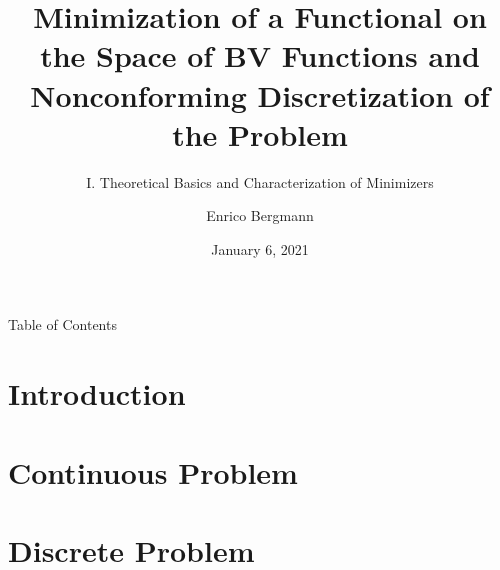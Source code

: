 \documentclass[xcolor=svgnames,english]{beamer}
\author{Enrico Bergmann}
\title{Minimization of a Functional on the Space of BV Functions and 
Nonconforming Discretization of the Problem}
\subtitle{I. Theoretical Basics and Characterization of Minimizers}
\institute{Humboldt-Universität zu Berlin}
\date{January 6, 2021}
\begin{document}
\begin{frame}
	\maketitle
\end{frame}
  
\begin{frame}{Table of Contents}
  \tableofcontents
\end{frame}


\section{Introduction}


\section{Continuous Problem}


\section{Discrete Problem}

\end{document}
